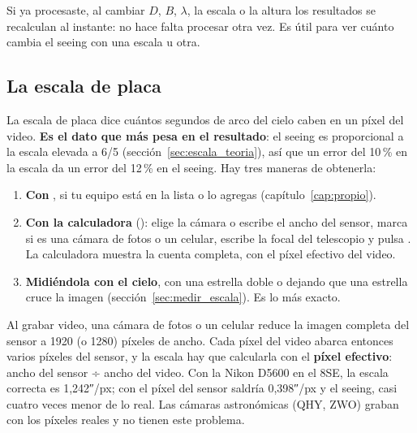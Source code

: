 Si ya procesaste, al cambiar $D$, $B$, $\lambda$, la escala o la altura los resultados se recalculan al instante: no hace
falta procesar otra vez. Es útil para ver cuánto cambia el seeing con una escala u otra.

\subsection{La escala de placa}\label{sec:escala_app}

La escala de placa dice cuántos segundos de arco del cielo caben en un píxel del video. \textbf{Es el dato que más pesa en
el resultado}: el seeing es proporcional a la escala elevada a 6/5 (sección~\ref{sec:escala_teoria}), así que un error
del 10\,\% en la escala da un error del 12\,\% en el seeing. Hay tres maneras de obtenerla:
\begin{enumerate}
\item \textbf{Con }, si tu equipo está en la lista o lo agregas (capítulo~\ref{cap:propio}).
\item \textbf{Con la calculadora} (): elige la cámara o escribe el ancho del sensor, marca
 si es una cámara de fotos o un celular, escribe la focal del telescopio y pulsa . La
calculadora muestra la cuenta completa, con el píxel efectivo del video.
\item \textbf{Midiéndola con el cielo}, con una estrella doble o dejando que una estrella cruce la imagen
(sección~\ref{sec:medir_escala}). Es lo más exacto.
\end{enumerate}


\begin{cuidado}
Al grabar video, una cámara de fotos o un celular reduce la imagen completa del sensor a 1920 (o 1280) píxeles de ancho.
Cada píxel del video abarca entonces varios píxeles del sensor, y la escala hay que calcularla con el \textbf{píxel
efectivo}: ancho del sensor ÷ ancho del video. Con la Nikon D5600 en el 8SE, la escala correcta es 1,242″/px; con el
píxel del sensor saldría 0,398″/px y el seeing, casi cuatro veces menor de lo real. Las cámaras astronómicas (QHY, ZWO)
graban con los píxeles reales y no tienen este problema.
\end{cuidado}

